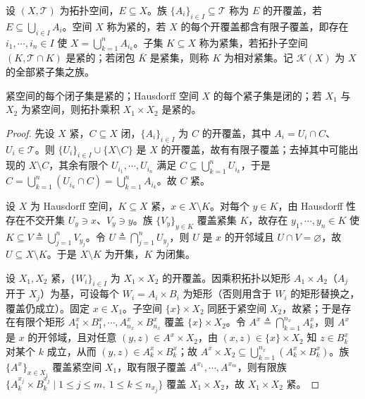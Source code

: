 \documentclass[../main.tex]{subfiles}
\begin{document}
\begin{definition}[开覆盖与紧集]\label{definition:appA-紧性}
设 $(X,\mathscr{T})$ 为拓扑空间，$E\subseteq X$。族 $\{A_i\}_{i\in I}\subseteq\mathscr{T}$ 称为 $E$ 的开覆盖，若 $E\subseteq\bigcup_{i\in I}A_i$。空间 $X$ 称为紧的，若 $X$ 的每个开覆盖都含有限子覆盖，即存在 $i_1,\cdots ,i_n\in I$ 使 $X=\bigcup_{k=1}^nA_{i_k}$。子集 $K\subseteq X$ 称为紧集，若拓扑子空间 $(K,\mathscr{T}\cap K)$ 是紧的；若闭包 $\overline{K}$ 是紧集，则称 $K$ 为相对紧集。记 $\mathcal{K}(X)$ 为 $X$ 的全部紧子集之族。
\end{definition}

紧空间的每个闭子集是紧的；Hausdorff 空间 $X$ 的每个紧子集是闭的；若 $X_1$ 与 $X_2$ 为紧空间，则拓扑乘积 $X_1\times X_2$ 是紧的。

\begin{proof}
先设 $X$ 紧，$C\subseteq X$ 闭，$\{A_i\}_{i\in I}$ 为 $C$ 的开覆盖，其中 $A_i=U_i\cap C$、$U_i\in\mathscr{T}$。则 $\{U_i\}_{i\in I}\cup\{X\setminus C\}$ 是 $X$ 的开覆盖，故有有限子覆盖；去掉其中可能出现的 $X\setminus C$，其余有限个 $U_{i_1},\cdots ,U_{i_n}$ 满足 $C\subseteq\bigcup_{k=1}^nU_{i_k}$，于是 $C=\bigcup_{k=1}^n(U_{i_k}\cap C)=\bigcup_{k=1}^nA_{i_k}$。故 $C$ 紧。

设 $X$ 为 Hausdorff 空间，$K\subseteq X$ 紧，$x\in X\setminus K$。对每个 $y\in K$，由 Hausdorff 性存在不交开集 $U_y\ni x$、$V_y\ni y$。族 $\{V_y\}_{y\in K}$ 覆盖紧集 $K$，故存在 $y_1,\cdots ,y_n\in K$ 使 $K\subseteq V\triangleq\bigcup_{j=1}^nV_{y_j}$。令 $U\triangleq\bigcap_{j=1}^nU_{y_j}$，则 $U$ 是 $x$ 的开邻域且 $U\cap V=\varnothing$，故 $U\subseteq X\setminus K$。于是 $X\setminus K$ 为开集，$K$ 为闭集。

设 $X_1,X_2$ 紧，$\{W_i\}_{i\in I}$ 为 $X_1\times X_2$ 的开覆盖。因乘积拓扑以矩形 $A_1\times A_2$（$A_j$ 开于 $X_j$）为基，可设每个 $W_i=A_i\times B_i$ 为矩形（否则用含于 $W_i$ 的矩形替换之，覆盖仍成立）。固定 $x\in X_1$。子空间 $\{x\}\times X_2$ 同胚于紧空间 $X_2$，故紧；于是存在有限个矩形 $A_1^x\times B_1^x,\cdots ,A_{n_x}^x\times B_{n_x}^x$ 覆盖 $\{x\}\times X_2$。令 $A^x\triangleq\bigcap_{k=1}^{n_x}A_k^x$，则 $A^x$ 是 $x$ 的开邻域，且对任意 $(y,z)\in A^x\times X_2$，由 $(x,z)\in\{x\}\times X_2$ 知 $z\in B_k^x$ 对某个 $k$ 成立，从而 $(y,z)\in A_k^x\times B_k^x$；故 $A^x\times X_2\subseteq\bigcup_{k=1}^{n_x}(A_k^x\times B_k^x)$。族 $\{A^x\}_{x\in X_1}$ 覆盖紧空间 $X_1$，取有限子覆盖 $A^{x_1},\cdots ,A^{x_m}$，则有限族 $\{A_k^{x_j}\times B_k^{x_j}\mid 1\leqslant j\leqslant m,\ 1\leqslant k\leqslant n_{x_j}\}$ 覆盖 $X_1\times X_2$，故 $X_1\times X_2$ 紧。
\end{proof}
\end{document}
